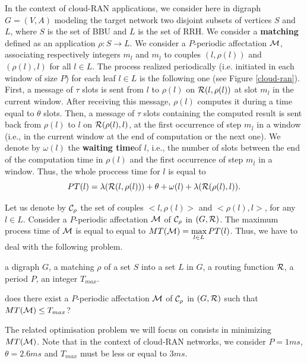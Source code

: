 \documentclass[a4paper,10pt]{article}
\begin{document}
      
      In the context of cloud-RAN applications, we consider here in digraph $G=(V,A)$ modeling the target network two disjoint subsets of vertices $S$ and $L$, where $S$ is the set of BBU and $L$ is the set of RRH. We consider a {\bf matching} defined as an application $\rho:S\rightarrow L$. We consider a $P$-periodic affectation $\cal M$, associating respectively integers $m_l$ and $m_{\overline l}$ to couples $(l,\rho(l))$ and $(\rho(l),l)$ for all $l \in L$. The process realized periodically (i.e. initiated in each window of size $P$) for each leaf $l \in L$ is the following one (see Figure \ref{cloud-ran}). First, a message of $\tau$ slots is sent from $l$ to $\rho(l)$ on ${\cal R}(l,\rho(l))$ at slot $m_l$ in the current window. After receiving this message, $\rho(l)$ computes it during a time equal to $\theta$ slots. Then, a message of $\tau$ slots containing the computed result is sent back from $\rho(l)$ to $l$ on ${\cal R}(\rho(l),l)$, at the first occurrence of  step $m_{\overline l}$ in a window (i.e., in the current window at the end of computation or the next one). We denote by $\omega(l)$ the {\bf waiting time}of $l$, i.e.,  the number of slots between the end of the computation time in $\rho(l)$ and the first occurrence of  step $m_{\overline l}$ in a window. Thus, the whole proccess time for $l$ is equal to
      $$
      PT(l)=\lambda({\cal R}(l,\rho(l)))+\theta+\omega(l)+\lambda({\cal R}(\rho(l),l)).
      $$
	
      Let us denote by ${\cal C}_{\rho}$ the set of couples $<l,\rho(l)>$ and $<\rho(l),l>$, for any $l \in L$. Consider a $P$-periodic affectation ${\cal M}$ of ${\cal C}_{\rho}$ in $(G,{\cal R})$. The maximum process time of ${\cal M}$ is equal to equal to $MT({\cal M})=\max\limits_{l \in L} PT(l)$. Thus, we have to deal with the following problem.\\


        a digraph $G$, a matching $\rho$ of a set $S$ into a set $L$ in $G$, a routing function $\cal R$, a period $P$, an integer $T_{max}$.

       does there exist  a $P$-periodic affectation ${\cal M}$ of ${\cal C}_{\rho}$ in $(G,{\cal R})$ such that $MT({\cal M}) \leq T_{max}$?

      The related optimisation problem we will focus on  consists in minimizing  $MT({\cal M})$. Note that in the context of cloud-RAN networks, we consider $P=1ms$, $\theta=2.6ms$ and $T_{max}$ must be less or equal to $3ms$.
\end{document}
